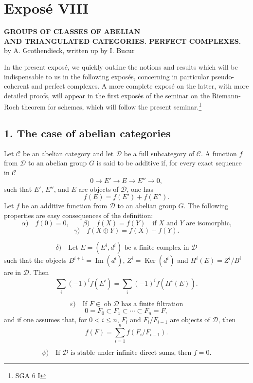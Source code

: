 \documentclass[11pt]{article}
\providecommand{\Ob}{\operatorname{ob}}
\providecommand{\cC}{\mathcal C}
\providecommand{\Ob}{\operatorname{ob}}
\providecommand{\cC}{\mathcal C}
\providecommand{\cD}{\mathcal D}
\providecommand{\Ob}{\operatorname{Ob}}
\providecommand{\Ob}{\operatorname{ob}}
\begin{document}
\newpage
\section*{Exposé VIII}

\begin{center}
\textbf{GROUPS OF CLASSES OF ABELIAN}\\
\textbf{AND TRIANGULATED CATEGORIES. PERFECT COMPLEXES.}\\[1ex]
by A. Grothendieck, written up by I. Bucur
\end{center}

In the present exposé, we quickly outline the notions and results which will be indispensable to us in the following exposés, concerning in particular pseudo-coherent and perfect complexes. A more complete exposé on the latter, with more detailed proofs, will appear in the first exposés of the seminar on the Riemann-Roch theorem for schemes, which will follow the present seminar.\footnote{SGA 6 I}

\subsection*{1. The case of abelian categories}

Let $\cC$ be an abelian category and let $\cD$ be a full subcategory of $\cC$. A function $f$ from $\cD$ to an abelian group $G$ is said to be additive if, for every exact sequence in $\cC$
\[
0\longrightarrow E'\longrightarrow E\longrightarrow E''\longrightarrow 0,
\]
such that $E'$, $E''$, and $E$ are objects of $\cD$, one has
\[
f(E)=f(E')+f(E'').
\]
Let $f$ be an additive function from $\cD$ to an abelian group $G$. The following properties are easy consequences of the definition:
\[
\alpha)\quad f(0)=0,\qquad
\beta)\quad f(X)=f(Y)\quad\text{if }X\text{ and }Y\text{ are isomorphic,}
\]
\[
\gamma)\quad f(X\oplus Y)=f(X)+f(Y).
\]

\[
\delta)\quad
\text{Let }E=(E^i,d^i)\text{ be a finite complex in }\cD
\]
such that the objects $B^{i+1}=\operatorname{Im}(d^i)$, $Z^i=\operatorname{Ker}(d^i)$ and $H^i(E)=Z^i/B^i$ are in $\cD$. Then
\[
\sum_i (-1)^i f(E^i)=\sum_i (-1)^i f(H^i(E)).
\]

\[
\varepsilon)\quad
\text{If }F\in\Ob \cD\text{ has a finite filtration}
\]
\[
0=F_0\subset F_1\subset\cdots\subset F_n=F,
\]
and if one assumes that, for $0<i\le n$, $F_i$ and $F_i/F_{i-1}$ are objects of $\cD$, then
\[
f(F)=\sum_{i=1}^n f(F_i/F_{i-1}).
\]

\[
\psi)\quad
\text{If }\cD\text{ is stable under infinite direct sums, then }f=0.
\]
\end{document}
